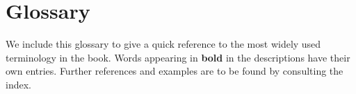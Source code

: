 

\newcommand{\gitem}[1]{\medskip\noindent{\bf #1\ \ \ }
                       }

\newcommand{\upp}[1]{\ensuremath{{}^{\mbox{\footnotesize\texttt #1}}}}

\chapter{Glossary}

We include this glossary to give a quick reference to the most
widely used terminology in the book. Words appearing in \textbf{bold} in the
descriptions have their own entries. Further references and examples are
to be found by consulting the index.
\normalfont\normalsize
\hspace*{12pt} 


